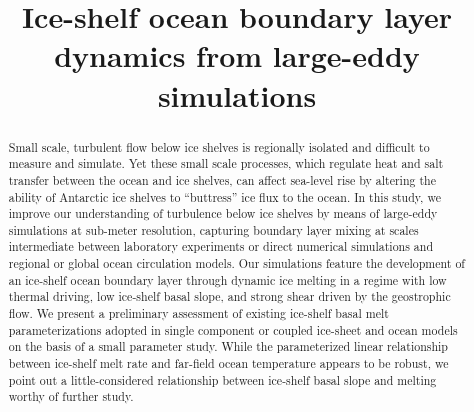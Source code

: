 \documentclass[tc, manuscript]{copernicus}
\begin{document}
\title{Ice-shelf ocean boundary layer dynamics from large-eddy simulations}






\received{}
\pubdiscuss{}
\revised{}
\accepted{}
\published{}


\maketitle

\begin{abstract}
Small scale, turbulent flow below ice shelves is regionally isolated and difficult to measure and simulate.  Yet these small scale processes, which regulate heat and salt transfer between the ocean and ice shelves, can affect sea-level rise by altering the ability of Antarctic ice shelves to “buttress” ice flux to the ocean. In this study, we improve our understanding of turbulence below ice shelves by means of large-eddy simulations at sub-meter resolution, capturing boundary layer mixing at scales intermediate between laboratory experiments or direct numerical simulations and regional or global ocean circulation models. Our simulations feature the development of an ice-shelf ocean boundary layer through dynamic ice melting in a regime with low thermal driving, low ice-shelf basal slope, and strong shear driven by the geostrophic flow. We present a preliminary assessment of existing ice-shelf basal melt parameterizations adopted in single component or coupled ice-sheet and ocean models on the basis of a small parameter study. While the parameterized linear relationship between ice-shelf melt rate and far-field ocean temperature appears to be robust, we point out a little-considered relationship between ice-shelf basal slope and melting worthy of further study.
\end{abstract}

\introduction
\end{document}
